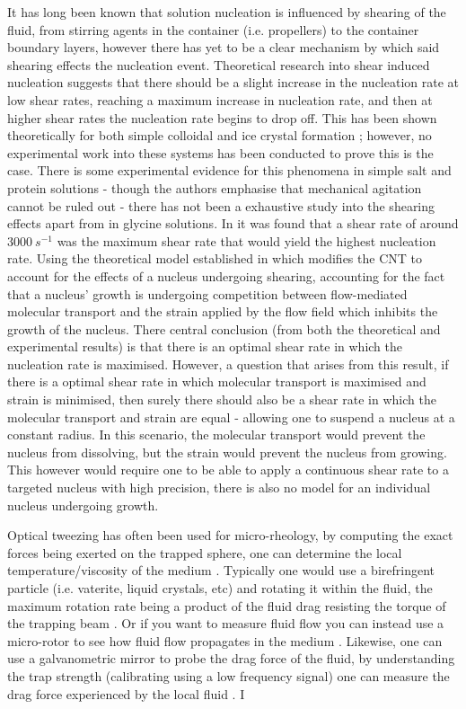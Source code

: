 It has long been known that solution nucleation is influenced by shearing of the fluid, from stirring agents in the container (i.e. propellers) to the container boundary layers, however there has yet to be a clear mechanism by which said shearing effects the nucleation event. Theoretical research into shear induced nucleation suggests that there should be a slight increase in the nucleation rate at low shear rates, reaching a maximum increase in nucleation rate, and then at higher shear rates the nucleation rate begins to drop off. This has been shown theoretically for both simple colloidal \cite{Mura2016,Debuysschere2023,Richard2015}  and ice crystal formation \cite{Goswami2020}; however, no experimental work into these systems has been conducted to prove this is the case.  There is some experimental evidence for this phenomena in simple salt and protein solutions - though the authors emphasise that mechanical agitation cannot be ruled out - there has not been a exhaustive study into the shearing effects apart from in glycine solutions. In \cite{Debuysschere2023} it was found that a shear rate of around $3000\ s^{-1}$ was the maximum shear rate that would yield the highest nucleation rate. Using the theoretical model established in \cite{Mura2016,2001} which modifies the CNT to account for the effects of a nucleus undergoing shearing, accounting for the fact that a nucleus' growth is undergoing competition between flow-mediated molecular transport and the strain applied by the flow field which inhibits the growth of the nucleus. There central conclusion (from both the theoretical and experimental results) is that there is an optimal shear rate in which the nucleation rate is maximised. However, a question that arises from this result, if there is a optimal shear rate in which molecular transport is maximised and strain is minimised, then surely there should also be a shear rate in which the molecular transport and strain are equal - allowing one to suspend a nucleus at a constant radius. In this scenario, the molecular transport would prevent the nucleus from dissolving, but the strain would prevent the nucleus from growing. This however would require one to be able to apply a continuous shear rate to a targeted nucleus with high precision, there is also no model for an individual nucleus undergoing growth. 

Optical tweezing has often been used for micro-rheology, by computing the
exact forces being exerted on the trapped sphere, one can determine the
local temperature/viscosity of the medium \cite{Millen2014, RodriguezSevilla2018}.
Typically one would use a birefringent particle (i.e. vaterite, liquid
crystals, etc) and rotating it within the fluid, the maximum rotation
rate being a product of the fluid drag resisting the torque of the 
trapping beam \cite{RodriguezSevilla2018}. Or if you want to measure 
fluid flow you can instead use a micro-rotor to see how fluid flow 
propagates in the medium \cite{Knoener2005}. Likewise, one can use 
a galvanometric mirror to probe the drag force of the fluid, by 
understanding the trap strength (calibrating using a low frequency 
signal) one can measure the drag force experienced by the local fluid \cite{RobertsonAnderson2018}. I

